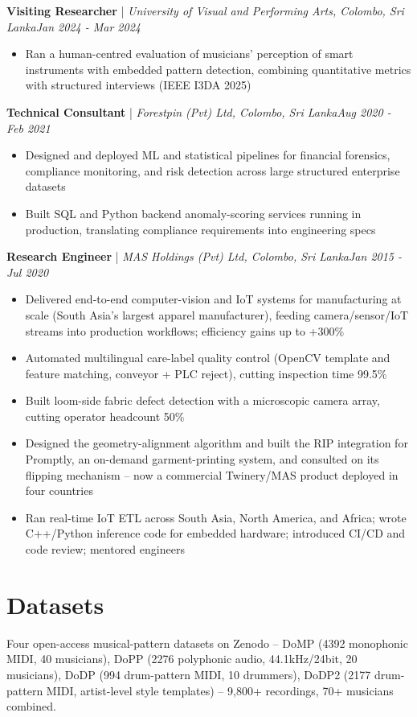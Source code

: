 \documentclass[11pt]{article}
\newenvironment{cvrole}[5]{%
  \par\noindent\textbf{\large #1} | \textit{\small #2, #3}\hfill \textit{\small #4 - #5}\par
  \begin{itemize}[leftmargin=2em, itemsep=-0.3em, topsep=-0.5em]%
}{%
  \end{itemize}\par\noindent\mbox{}\par\vspace{0.1em}%
}
\begin{document}
\begin{cvrole}{Visiting Researcher}{University of Visual and Performing Arts}{Colombo, Sri Lanka}{Jan 2024}{Mar 2024}
    \item Ran a human-centred evaluation of musicians' perception of smart instruments with embedded pattern detection, combining quantitative metrics with structured interviews (IEEE I3DA 2025)
\end{cvrole}

\begin{cvrole}{Technical Consultant}{Forestpin (Pvt) Ltd}{Colombo, Sri Lanka}{Aug 2020}{Feb 2021}
    \item Designed and deployed ML and statistical pipelines for financial forensics, compliance monitoring, and risk detection across large structured enterprise datasets
    \item Built SQL and Python backend anomaly-scoring services running in production, translating compliance requirements into engineering specs
\end{cvrole}

\begin{cvrole}{Research Engineer}{MAS Holdings (Pvt) Ltd}{Colombo, Sri Lanka}{Jan 2015}{Jul 2020}
    \item Delivered end-to-end computer-vision and IoT systems for manufacturing at scale (South Asia's largest apparel manufacturer), feeding camera/sensor/IoT streams into production workflows; efficiency gains up to +300\%
    \item Automated multilingual care-label quality control (OpenCV template and feature matching, conveyor + PLC reject), cutting inspection time 99.5\%
    \item Built loom-side fabric defect detection with a microscopic camera array, cutting operator headcount 50\%
    \item Designed the geometry-alignment algorithm and built the RIP integration for Promptly, an on-demand garment-printing system, and consulted on its flipping mechanism -- now a commercial Twinery/MAS product deployed in four countries
    \item Ran real-time IoT ETL across South Asia, North America, and Africa; wrote C++/Python inference code for embedded hardware; introduced CI/CD and code review; mentored engineers
\end{cvrole}

\section*{Datasets}
Four open-access musical-pattern datasets on Zenodo -- DoMP (4392 monophonic MIDI, 40 musicians), DoPP (2276 polyphonic audio, 44.1kHz/24bit, 20 musicians), DoDP (994 drum-pattern MIDI, 10 drummers), DoDP2 (2177 drum-pattern MIDI, artist-level style templates) -- 9,800+ recordings, 70+ musicians combined.
\end{document}
